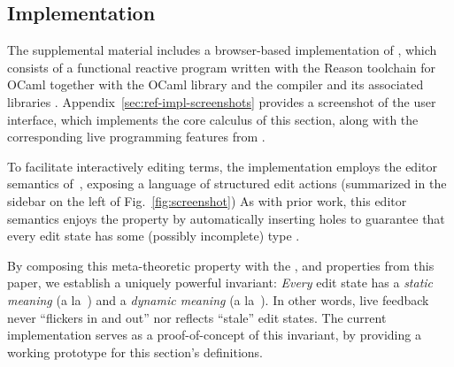 \subsection{Implementation}\label{sec:implementation}

The supplemental material includes a browser-based implementation
of \HazelnutLive, which consists of a functional reactive program
%
%
%
written with the Reason toolchain for OCaml \cite{reason-what,leroy03:_ocaml} 
together with the OCaml  library \cite{OcamlReact} 
and the  compiler and its associated libraries \cite{vouillon2014bytecode}. 
%
Appendix~\ref{sec:ref-impl-screenshots} provides a screenshot of the user interface, 
which implements the core calculus of this section, 
along with the corresponding live programming features from .

To facilitate interactively editing terms, the implementation employs
the editor semantics of~\Hazelnut, exposing a language of structured
edit actions (summarized in the sidebar on the left of
Fig.~\ref{fig:screenshot})
%
As with prior work, this editor semantics enjoys
the  property by automatically inserting holes
to guarantee that every edit state has some (possibly incomplete) type
.

By composing this meta-theoretic property with
the , 
and  properties from this paper, we establish a
uniquely powerful invariant: \emph{Every} edit state has a \emph{static
meaning} (a la~\Hazelnut) and a \emph{dynamic meaning} (a la~\HazelnutLive).
%
In other words, live feedback never ``flickers in and out'' nor reflects ``stale'' edit states.
%
The current implementation serves as a proof-of-concept of this invariant, 
by providing a working prototype for this section's definitions.




